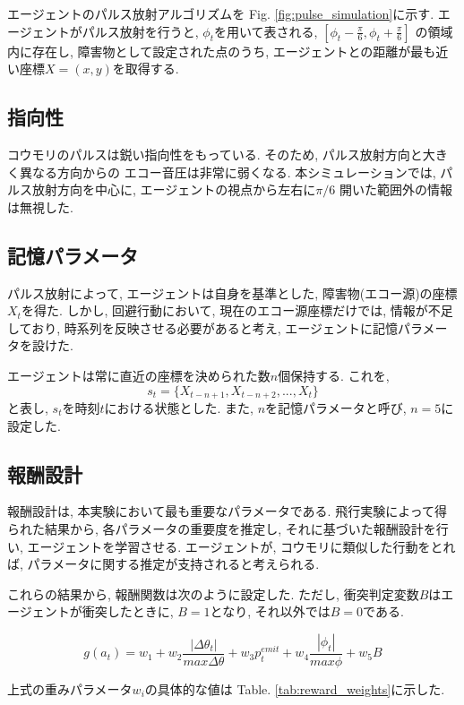 \documentclass[../main]{subfiles}
\begin{document}
エージェントのパルス放射アルゴリズムを
Fig. \ref{fig:pulse_simulation}に示す.
エージェントがパルス放射を行うと, 
$\phi_t$を用いて表される, 
$[\phi_t-\frac{\pi}{6}, \phi_t+\frac{\pi}{6}]$
の領域内に存在し, 障害物として設定された点のうち, 
エージェントとの距離が最も近い座標$X=(x, y)$を取得する.

\subsection{指向性}
コウモリのパルスは鋭い指向性をもっている.
そのため, パルス放射方向と大きく異なる方向からの
エコー音圧は非常に弱くなる.
本シミュレーションでは, パルス放射方向を中心に, 
エージェントの視点から左右に$\pi/6$
開いた範囲外の情報は無視した.

\subsection{記憶パラメータ}
パルス放射によって, エージェントは自身を基準とした, 
障害物(エコー源)の座標$X_t$を得た. 
しかし, 回避行動において, 現在のエコー源座標だけでは, 
情報が不足しており, 時系列を反映させる必要があると考え, 
エージェントに記憶パラメータを設けた.

エージェントは常に直近の座標を決められた数$n$個保持する. 
これを, 
$$
s_t = \{X_{t-n+1}, X_{t-n+2}, ..., X_t\}
$$
と表し, $s_t$を時刻$t$における状態とした.
また, $n$を記憶パラメータと呼び, $n=5$に設定した.

\subsection{報酬設計}
報酬設計は, 本実験において最も重要なパラメータである.
飛行実験によって得られた結果から, 各パラメータの重要度を推定し, 
それに基づいた報酬設計を行い, エージェントを学習させる. 
エージェントが, コウモリに類似した行動をとれば, 
パラメータに関する推定が支持されると考えられる.

これらの結果から, 報酬関数は次のように設定した. 
ただし, 衝突判定変数$B$はエージェントが衝突したときに, $B=1$となり, 
それ以外では$B=0$である.

\begin{equation}
\label{eq:reward_func}
 g(a_t) = 
w_1 +
w_2 \frac{|\Delta\theta_t|}{max \Delta\theta} +
w_3 p^{emit}_t +
w_4 \frac{|\phi_t|}{max \phi} +
w_5 B
\end{equation}

上式の重みパラメータ$w_i$の具体的な値は
Table. \ref{tab:reward_weights}に示した.
\end{document}

